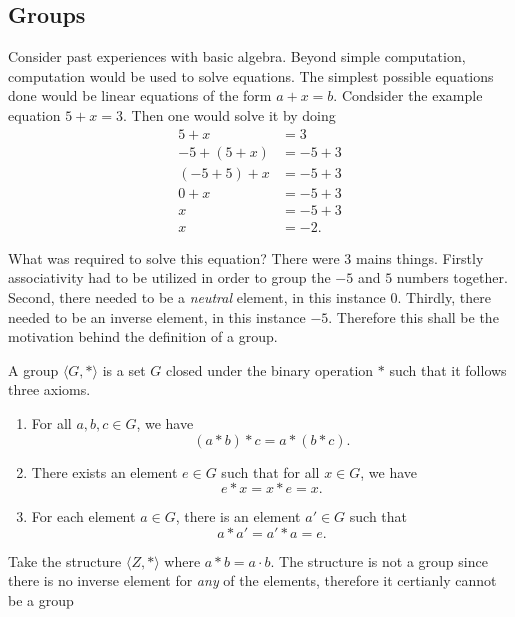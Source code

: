 \documentclass[../notes.tex]{subfiles}
\begin{document}

\subsection{Groups}

Consider past experiences with basic algebra. Beyond simple computation, computation would be used to solve equations. The simplest possible equations done would be linear equations of the form $a + x = b$. Condsider the example equation $5 + x = 3$. Then one would solve it by doing
\begin{align*}
	5 + x &= 3 \\
	-5 + (5 + x) &= -5 + 3 \\
	(-5 + 5) + x &= -5 + 3 \\
	0 + x &= -5 + 3 \\
	x &= -5 + 3 \\
	x &= -2
.\end{align*}

What was required to solve this equation? There were 3 mains things. Firstly associativity had to be utilized in order to group the $-5$ and $5$ numbers together. Second, there needed to be a \textit{neutral} element, in this instance $0$. Thirdly, there needed to be an inverse element, in this instance $-5$. Therefore this shall be the motivation behind the definition of a group.

\begin{definition}[Group]
	A group $\langle G, * \rangle$ is a set $G$ closed under the binary operation $*$ such that it follows three axioms.
	\begin{enumerate}
		\item For all $a,b,c \in G$, we have
			\[
				(a * b) * c = a * (b * c)
			.\]
		\item There exists an element $e \in G$ such that for all $x \in G$, we have
			\[
				e * x = x * e = x
			.\]
		\item For each element $a \in G$, there is an element $a' \in G$ such that
			\[
				a * a' = a' * a = e
			.\]
	\end{enumerate}
\end{definition}

\begin{example}
	Take the structure $\langle Z, * \rangle$ where $a * b = a\cdot b$. The structure is not a group since there is no inverse element for \textit{any} of the elements, therefore it certianly cannot be a group
\end{example}
\end{document}
